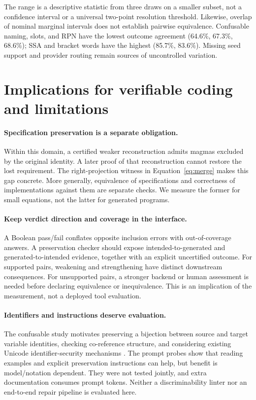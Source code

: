 \documentclass{article}
\newcommand{\pct}{\%}
\begin{document}
The range is a descriptive statistic from three draws on a smaller subset, not
a confidence interval or a universal two-point resolution threshold. Likewise,
overlap of nominal marginal intervals does not establish pairwise equivalence.
Confusable naming, slots, and RPN have the lowest outcome agreement
(64.6\pct{}, 67.3\pct{}, 68.6\pct{}); SSA and bracket words have the highest
(85.7\pct{}, 83.6\pct{}). Missing seed support and provider routing remain
sources of uncontrolled variation.

\section{Implications for verifiable coding and limitations}
\label{sec:discussion}

\paragraph{Specification preservation is a separate obligation.}
Within this domain, a certified weaker reconstruction admits magmas excluded by
the original identity. A later proof of that reconstruction cannot restore the
lost requirement. The right-projection witness in Equation~\ref{eq:merge} makes
this gap concrete. More generally, equivalence of specifications and correctness
of implementations against them are separate checks. We measure the former for
small equations, not the latter for generated programs.

\paragraph{Keep verdict direction and coverage in the interface.}
A Boolean pass/fail conflates opposite inclusion errors with out-of-coverage
answers. A preservation checker should expose intended-to-generated and
generated-to-intended evidence, together with an explicit uncertified outcome.
For supported pairs, weakening and strengthening have distinct downstream
consequences. For unsupported pairs, a stronger backend or human assessment is
needed before declaring equivalence or inequivalence. This is an implication of
the measurement, not a deployed tool evaluation.

\paragraph{Identifiers and instructions deserve evaluation.}
The confusable study motivates preserving a bijection between source and target
variable identities, checking co-reference structure, and considering existing
Unicode identifier-security mechanisms \citep{unicode2025security}.
The prompt probes show that reading examples and explicit preservation
instructions can help, but benefit is model/notation dependent. They were not
tested jointly, and extra documentation consumes prompt tokens. Neither a
discriminability linter nor an end-to-end repair pipeline is evaluated here.
\end{document}
